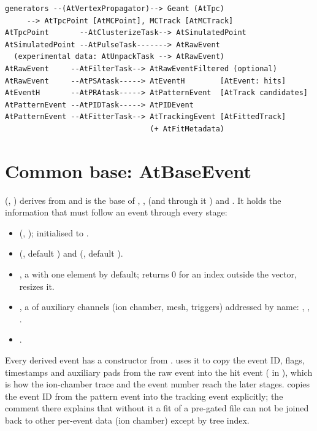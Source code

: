 \begin{verbatim}
generators --(AtVertexPropagator)--> Geant (AtTpc)
     --> AtTpcPoint [AtMCPoint], MCTrack [AtMCTrack]
AtTpcPoint       --AtClusterizeTask--> AtSimulatedPoint
AtSimulatedPoint --AtPulseTask-------> AtRawEvent
  (experimental data: AtUnpackTask --> AtRawEvent)
AtRawEvent     --AtFilterTask--> AtRawEventFiltered (optional)
AtRawEvent     --AtPSAtask-----> AtEventH        [AtEvent: hits]
AtEventH       --AtPRAtask-----> AtPatternEvent  [AtTrack candidates]
AtPatternEvent --AtPIDTask-----> AtPIDEvent
AtPatternEvent --AtFitterTask--> AtTrackingEvent [AtFittedTrack]
                                 (+ AtFitMetadata)
\end{verbatim}

\section{Common base: AtBaseEvent}
\label{sec:dm-baseevent}

 (, ) derives from
 and is the base of , ,  (and through it
) and . It holds the information that must follow an event
through every stage:

\begin{itemize}
\item {} (, ); initialised to .
\item {} (, default ) and 
  (, default ).
\item {}, a  with one element by default; 
  returns 0 for an index outside the vector,  resizes it.
\item {}, a  of auxiliary channels (ion chamber,
  mesh, triggers) addressed by name: , , .
\item {}.
\end{itemize}

Every derived event has a constructor from .  uses it to copy
the event ID, flags, timestamps and auxiliary pads from the raw event into the hit event
( in ), which is how the ion-chamber trace and the event
number reach the later stages.  copies the event ID from the pattern event into
the tracking event explicitly; the comment there explains that without it a fit of a pre-gated file can
not be joined back to other per-event data (ion chamber) except by tree index.

